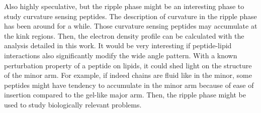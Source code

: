 Also highly speculative, but the ripple phase might be an interesting phase
to study curvature sensing peptides. The description of curvature in the
ripple phase has been around for a while. Those curvature sensing peptides
may accumulate at the kink regions. Then, the electron density profile
can be calculated with the analysis detailed in this work. It would 
be very interesting if peptide-lipid interactions also significantly 
modify the wide angle pattern. With a known perturbation property of 
a peptide on lipids, it could shed light on the structure of the minor arm.
For example, if indeed chains are fluid like in the minor, some peptides
might have tendency to accumulate in the minor arm because of ease of 
insertion compared to the gel-like major arm.
Then, the ripple phase might be used to study biologically relevant problems.
